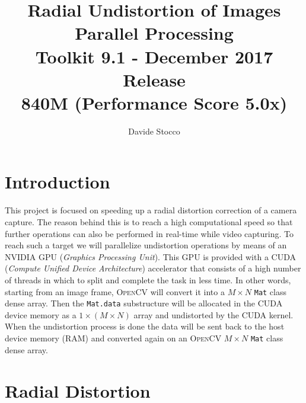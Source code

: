 \documentclass[12pt]{article}
\author{Davide Stocco}
\title{
  \textbf{Radial Undistortion of Images}\\
	\Nvidia{} \Cuda{} Parallel Processing\\
	\vspace{0.2in}
	\large{\Cuda{} Toolkit 9.1 - December 2017 Release\\
	\vspace{0.02in}
	\Nvidia{} \GeForce{} 840M (Performance Score 5.0x)}
}
\newcommand*{\Nvidia}{\textsc{NVIDIA}}
\newcommand*{\Cuda}{\textsc{CUDA}}
\newcommand*{\OpenCV}{\textsc{OpenCV}}
\begin{document}
\maketitle
\vfill
\tableofcontents
\pagebreak
%
\section{Introduction}

This project is focused on speeding up a radial distortion correction of a camera capture. The reason behind this is to reach a high computational speed so that further operations can also be performed in real-time while video capturing. To reach such a target we will parallelize undistortion operations by means of an \Nvidia{} GPU (\emph{Graphics Processing Unit}). This GPU is provided with a \Cuda{} (\emph{Compute Unified Device Architecture}) accelerator that consists of a high number of threads in which to split and complete the task in less time. In other words, starting from an image frame, \OpenCV{} will convert it into a $M \times N$ \texttt{Mat} class dense array. Then the \texttt{Mat.data} substructure will be allocated in the \Cuda{} device memory as a $1 \times (M \times N)$ array and undistorted by the \Cuda{} kernel. When the undistortion process is done the data will be sent back to the host device memory (RAM) and converted again on an \OpenCV{} $M \times N$ \texttt{Mat} class dense array.

\section{Radial Distortion}
\end{document}
